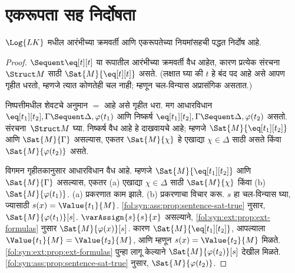 \section{एकरूपता सह निर्दोषता}\label{fol:seq:sid:sec}

\begin{prop}
$\Log{LK}$ मधील आरंभीच्या क्रमवर्ती आणि एकरूपतेच्या नियमांसहची पद्धत निर्दोष आहे.
\end{prop}

\begin{proof}
${} \Sequent \eq[t][t]$ या रूपातील आरंभीच्या क्रमवर्ती वैध आहेत, कारण
प्रत्येक संरचना~$\Struct M$ साठी $\Sat{M}{\eq[t][t]}$ असते. (लक्षात घ्या की
$t$ हे बंद पद आहे असे आपण गृहीत धरतो, म्हणजे त्यात कोणतेही चल नाही;
म्हणून चल-विन्यास अप्रासंगिक असतात.)

निष्पत्तीमधील शेवटचे अनुमान $=$ आहे असे गृहीत धरा. मग आधारविधान
$\eq[t_1][t_2], \Gamma \Sequent \Delta, \varphi(t_1)$ आणि निष्कर्ष
$\eq[t_1][t_2], \Gamma \Sequent \Delta, \varphi(t_2)$ असतो. संरचना~$\Struct M$
घ्या. निष्कर्ष वैध आहे हे दाखवायचे आहे; म्हणजे $\Sat{M}{\eq[t_1][t_2]}$ आणि
$\Sat{M}{\Gamma}$ असल्यास, एकतर $\Sat{M}{\chi}$ हे एखाद्या $\chi \in \Delta$ साठी
असते किंवा $\Sat{M}{\varphi(t_2)}$ असते.

विगमन गृहीतकानुसार आधारविधान वैध आहे. म्हणजे $\Sat{M}{\eq[t_1][t_2]}$ आणि
$\Sat{M}{\Gamma}$ असल्यास, एकतर (a) एखाद्या $\chi \in \Delta$ साठी
$\Sat{M}{\chi}$ किंवा (b) $\Sat{M}{\varphi(t_1)}$. (a) प्रकरणात काम झाले.
(b) प्रकरणाचा विचार करू. $s$ हा चल-विन्यास घ्या, ज्यासाठी
$s(x) = \Value{t_1}{M}$. \ref{fol:syn:ass:prop:sentence-sat-true} नुसार,
$\Sat{M}{\varphi(t_1)}[s]$. $\varAssign{s}{s}{x}$ असल्याने,
\ref{fol:syn:ext:prop:ext-formulas} नुसार $\Sat{M}{\varphi(x)}[s]$. कारण
$\Sat{M}{\eq[t_1][t_2]}$, आपल्याला $\Value{t_1}{M} = \Value{t_2}{M}$,
आणि म्हणून $s(x) = \Value{t_2}{M}$ मिळते. \ref{fol:syn:ext:prop:ext-formulas}
पुन्हा लागू केल्याने $\Sat{M}{\varphi(t_2)}[s]$ देखील मिळते.
\ref{fol:syn:ass:prop:sentence-sat-true} नुसार,
$\Sat{M}{\varphi(t_2)}$.
\end{proof}



